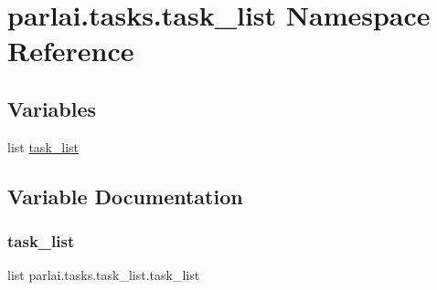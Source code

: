 \hypertarget{namespaceparlai_1_1tasks_1_1task__list}{}\section{parlai.\+tasks.\+task\+\_\+list Namespace Reference}
\label{namespaceparlai_1_1tasks_1_1task__list}
\subsection*{Variables}
\begin{DoxyCompactItemize}
\item 
list \hyperlink{namespaceparlai_1_1tasks_1_1task__list_a9542b1f0c30a9cf43b5926448533aea2}{task\+\_\+list}
\end{DoxyCompactItemize}


\subsection{Variable Documentation}
\mbox{\label{namespaceparlai_1_1tasks_1_1task__list_a9542b1f0c30a9cf43b5926448533aea2}} 
\subsubsection{\texorpdfstring{task\+\_\+list}{task\_list}}
{\footnotesize\ttfamily list parlai.\+tasks.\+task\+\_\+list.\+task\+\_\+list}

